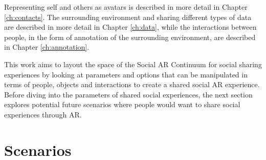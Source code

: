 Representing self and others as avatars is described in more detail in Chapter \ref{ch:contacts}. The surrounding environment and sharing different types of data are described in more detail in Chapter \ref{ch:data}, while the interactions between people, in the form of annotation of the surrounding environment, are described in Chapter \ref{ch:annotation}.



This work aims to layout the space of the Social AR Continuum for social sharing experiences by looking at parameters and options that can be manipulated in terms of people, objects and interactions to create a shared social AR experience. Before diving into the parameters of shared social experiences, the next section explores potential future scenarios where people would want to share social experiences through AR.

\pagebreak
\section{Scenarios}


